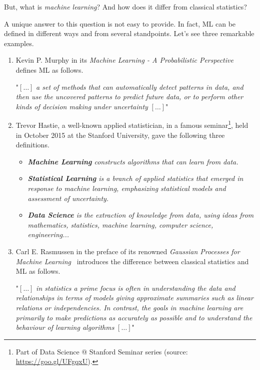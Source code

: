 But, what is \textit{machine learning}? And how does it differ from classical statistics?

A unique answer to this question is not easy to provide. In fact, ML can be defined in different ways and from several standpoints. Let's see three remarkable examples.

\begin{enumerate}
  \item Kevin P. Murphy in its \emph{Machine Learning - A Probabilistic Perspective}~\cite{murphy2012machine} defines ML as follows.

  \begin{displayquote}
  "$[\dots]$ \emph{a set of methods that can automatically detect patterns in data, and then use the uncovered patterns to predict future data, or to perform other kinds of decision making under uncertainty} $[\dots]$"
  \end{displayquote}

  \item Trevor Hastie, a well-known applied statistician, in a famous seminar\footnote{ Part of Data Science @ Stanford Seminar series (source: \url{https://goo.gl/UFgqxU}).}, held in October 2015 at the Stanford University, gave the following three definitions.

  \begin{displayquote}
    \begin{itemize}
      \item[] \emph{{\bf Machine Learning} constructs algorithms that can learn from data.}
      \item[] \emph{{\bf Statistical Learning}  is a branch of applied statistics that emerged in response to machine learning, emphasizing statistical models and assessment of uncertainty.}
      \item[] \emph{{\bf Data Science}  is the extraction of knowledge from data, using ideas from mathematics, statistics, machine learning, computer science, engineering...}
    \end{itemize}
  \end{displayquote}

  \item Carl E. Rasmussen in the preface of its renowned \emph{Gaussian Processes for Machine Learning}~\cite{rasmussen2006gaussian} introduces the difference between classical statistics and ML as follows.

  \begin{displayquote}
    "$[\dots]$ \emph{in statistics a prime focus is often in understanding the data and relationships in terms of models giving approximate summaries such as linear relations or independencies. In contrast, the goals in machine learning are primarily to make predictions as accurately as possible and to understand the behaviour of learning algorithms} $[\dots]$"
  \end{displayquote}

\end{enumerate}

